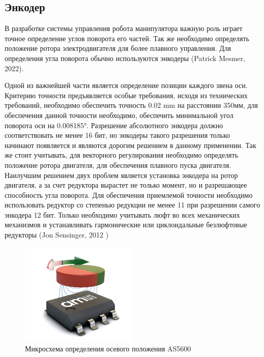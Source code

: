 \subsection{Энкодер}

В разработке системы управления робота манипулятора важную роль играет точное определение углов поворота его частей. Так же необходимо определять положение ротора электродвигателя для более плавного управления. Для определения угла поворота обычно используются энкодеры (Patrick Mesmer, 2022).

Одной из важнейшей части является определение позиции каждого звена оси. Критерию точности предъявляется особые требования, исходя из технических требований, необходимо обеспечить точность 0.02 mm на расстоянии 350мм, для обеспечения данной точности необходимо, обеспечить минимальной угол поворота оси на 0.008185°. Разрешение абсолютного энкодера должно соответствовать не менее 16 бит, но энкодеры такого разрешения только начинают появляется и являются дорогим решением в данному применении. Так же стоит учитывать, для векторного регулирования необходимо определять положение ротора двигателя, для обеспечения плавного пуска двигателя. Наилучшим решением двух проблем является установка энкодера на ротор двигателя, а за счет редуктора вырастет не только момент, но и разрешающее способность угла поворота.  Для обеспечения приемлемой точности необходимо использовать редуктор со степенью редукции не менее 11 при разрешении самого энкодера 12 бит. Только необходимо учитывать люфт во всех механических механизмов и устанавливать гармонические или циклоидальные безлюфтовые редукторы (Jon Sensinger, 2012 )



 \begin{figure}[H]
	\centering
	\includegraphics[width=0.5\textwidth]{Src/images/as5600.png}
	\caption{ Микросхема определения осевого положения AS5600}
	\label{as5600P}
\end{figure}

